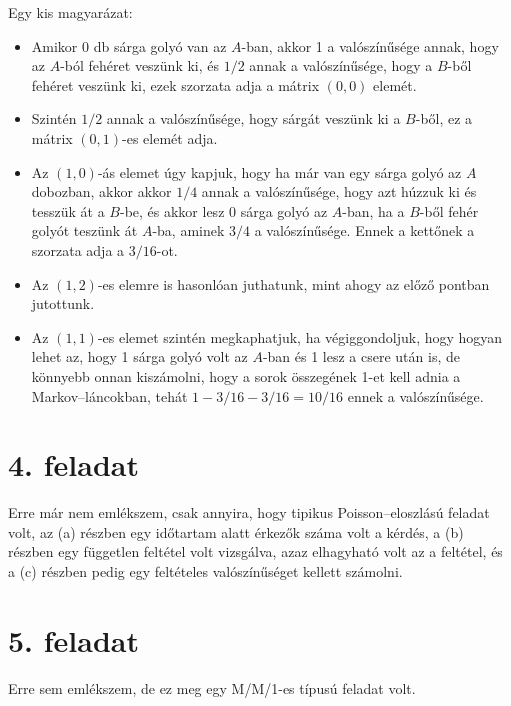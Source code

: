 \documentclass[a4paper,12pt]{article}
\begin{document}
Egy kis magyarázat: 
\begin{itemize}
\item Amikor 0 db sárga golyó van az $A$-ban, akkor
1 a valószínűsége annak, hogy az $A$-ból fehéret veszünk ki, és
$1/2$ annak a valószínűsége, hogy a $B$-ből fehéret veszünk ki, 
ezek szorzata adja a mátrix $(0, 0)$ elemét. 
\item Szintén $1/2$ annak a valószínűsége,
hogy sárgát veszünk ki a $B$-ből, ez a mátrix $(0, 1)$-es elemét adja.
\item Az $(1, 0)$-ás elemet úgy kapjuk, hogy ha már van egy sárga golyó
az $A$ dobozban, akkor akkor $1/4$ annak a valószínűsége, hogy azt
húzzuk ki és tesszük át a $B$-be, és akkor lesz 0 sárga golyó az 
$A$-ban, ha a $B$-ből fehér golyót teszünk át $A$-ba, aminek $3/4$ a 
valószínűsége. Ennek a kettőnek a szorzata adja a $3/16$-ot.
\item Az $(1, 2)$-es elemre is hasonlóan juthatunk, mint ahogy az
előző pontban jutottunk.
\item Az $(1, 1)$-es elemet szintén megkaphatjuk, ha végiggondoljuk, 
hogy hogyan lehet az, hogy 1 sárga golyó volt az $A$-ban és 1 lesz a
csere után is, de könnyebb onnan kiszámolni, hogy a sorok összegének
1-et kell adnia a Markov--láncokban, tehát $1-3/16-3/16 = 10/16$ ennek
a valószínűsége.
\end{itemize}

\section*{4. feladat}
Erre már nem emlékszem, csak annyira, hogy tipikus Poisson--eloszlású
feladat volt, az (a) részben egy időtartam alatt érkezők száma volt a
kérdés, a (b) részben egy független feltétel volt vizsgálva, azaz 
elhagyható volt az a feltétel, és a (c) részben pedig egy feltételes
valószínűséget kellett számolni.

\section*{5. feladat}
Erre sem emlékszem, de ez meg egy M/M/1-es típusú feladat volt.
\end{document}
